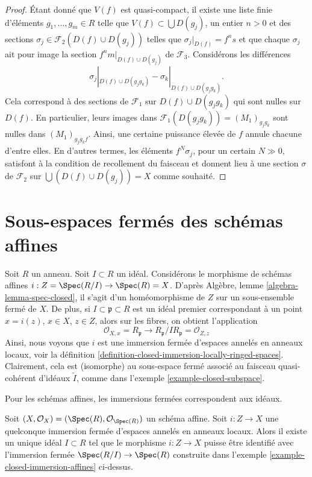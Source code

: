 \begin{proof}
\medskip\noindent
Étant donné que $V(f)$ est quasi-compact, il existe une liste
finie d'éléments $g_1, \ldots, g_m \in R$ telle que
$V(f) \subset \bigcup D(g_j)$, un entier $n > 0$ et des sections
$\sigma_j \in \mathcal{F}_2(D(f) \cup D(g_j))$ telles que
$\sigma_j|_{D(f)} = f^n s$ et que chaque $\sigma_j$ ait pour image la section
$f^nm|_{D(f) \cup D(g_j)}$ de $\mathcal{F}_3$.
Considérons les différences
$$
\sigma_j|_{D(f) \cup D(g_jg_k)}
-
\sigma_k|_{D(f) \cup D(g_jg_k)}.
$$
Cela correspond à des sections de $\mathcal{F}_1$ sur
$D(f) \cup D(g_jg_k)$ qui sont nulles sur
$D(f)$. En particulier, leurs images dans
$\mathcal{F}_1(D(g_jg_k)) = (M_1)_{g_jg_k}$ sont
nulles dans $(M_1)_{g_jg_kf}$. Ainsi,
une certaine puissance élevée de $f$ annule chacune d'entre elles.
En d'autres termes, les éléments $f^N \sigma_j$, pour un certain $N
\gg 0$, satisfont à la condition de recollement du faisceau et
donnent lieu à une section $\sigma $ de $\mathcal{F}_2$
sur $\bigcup (D(f) \cup D(g_j)) = X$ comme souhaité.
\end{proof}







\section{Sous-espaces fermés des schémas affines}
\label{section-closed-in-affine}

\begin{example}
\label{example-closed-immersion-affines}
Soit $R$ un anneau.
Soit $I \subset R$ un idéal. Considérons
le morphisme de schémas affines $i : Z =
\Spec(R/I) \to \Spec(R) = X$. D'après Algèbre,
lemme \ref{algebra-lemma-spec-closed}, il s'agit
d'un homéomorphisme de $Z$ sur un sous-ensemble fermé
de $X$. De plus, si $I \subset \mathfrak p \subset R$ est un idéal
premier correspondant à un point $x = i(z)$, $x \in X$, $z \in Z$,
alors sur les fibres, on obtient l'application
$$
\mathcal{O}_{X, x} = R_{\mathfrak p}
\longrightarrow
R_{\mathfrak p}/IR_{\mathfrak p} = \mathcal{O}_{Z, z}
$$
Ainsi, nous voyons que $i$ est une immersion fermée d'espaces annelés en
anneaux locaux, voir la définition \ref{definition-closed-immersion-locally-ringed-spaces}.
Clairement, cela est (isomorphe) au sous-espace fermé associé
au faisceau quasi-cohérent d'idéaux $\widetilde I$, comme dans
l'exemple \ref{example-closed-subspace}.
\end{example}

\begin{lemma}
\label{lemma-closed-immersion-affine-case}
\begin{slogan}
Pour les schémas affines, les immersions fermées correspondent aux idéaux.
\end{slogan}
Soit $(X, \mathcal{O}_X) = (\Spec(R), \mathcal{O}_{\Spec(R)})$ un
schéma affine. Soit $i : Z \to X$ une quelconque immersion fermée
d'espaces annelés en anneaux locaux. Alors il existe un unique
idéal $I \subset R$ tel que le morphisme $i : Z \to X$ puisse être identifié
avec l'immersion fermée $\Spec(R/I) \to \Spec(R)$
construite dans l'exemple \ref{example-closed-immersion-affines} ci-dessus.
\end{lemma}

